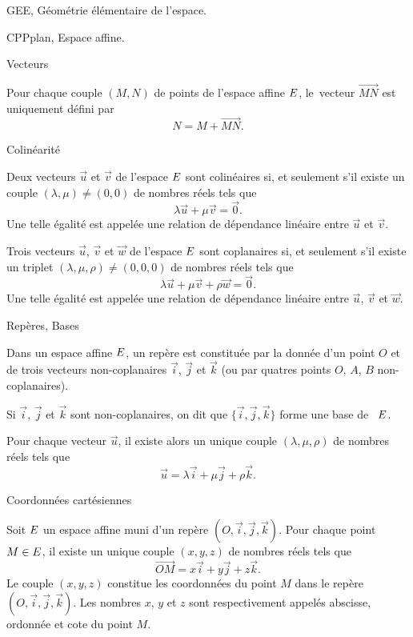 


\Chapter GEE, Géométrie élémentaire de l'espace.

\Section CPPplan, Espace affine. 

\Concept [] Vecteurs
 
\noindent
Pour chaque couple $(M,N)$ de points de l'espace affine $\sc E$, le~vecteur $\vec{MN}$ est uniquement défini par 
$$
N=M+\vec{MN}.
$$

\Concept [] Colinéarité 

\noindent
Deux vecteurs $\vec u$ et $\vec v$ de l'espace $\sc E$ sont colinéaires si, et seulement s'il existe un couple $(\lambda,\mu)\neq(0,0)$ de nombres réels tels que 
$$
\lambda \vec u+\mu\vec v=\vec 0.
$$
Une telle égalité est appelée une relation de dépendance linéaire entre $\vec u$ et $\vec v$. 
\bigskip

\noindent
Trois vecteurs $\vec u$, $\vec v$ et $\vec w$ de l'espace $\sc E$ sont coplanaires si, et seulement s'il existe un triplet $(\lambda,\mu, \rho)\neq(0,0,0)$ de nombres réels tels que 
$$
\lambda \vec u+\mu\vec v+\rho\vec w=\vec 0.
$$
Une telle égalité est appelée une relation de dépendance linéaire entre $\vec u$, $\vec v$ et $\vec w$. 
\bigskip


\Concept [] Repères, Bases

\noindent
Dans un espace affine $\sc E$, un repère est constituée par la donnée d'un point $O$ et de trois vecteurs non-coplanaires $\vec i$, $\vec j$ et $\vec k$ (ou par quatres points $O$, $A$, $B$ non-coplanaires). 
\medskip

\noindent
Si $\vec i$, $\vec j$ et $\vec k$ sont non-coplanaires, on dit que $\{\vec i,\vec j,\vec k\}$ forme une base de ~$\sc E$. 

\noindent
Pour chaque vecteur $\vec u$, il existe alors un unique couple $(\lambda,\mu,\rho)$ de nombres réels tels que 
$$
\vec u=\lambda \vec i+\mu\vec j+\rho\vec k.
$$ 

\Concept [] Coordonnées cartésiennes

\noindent
Soit $\sc E$ un espace affine muni d'un repère $(O,\vec i,\vec j,\vec k)$. Pour chaque point $M\in\sc E$, il existe un unique couple $(x,y,z)$ de nombres réels tels que 
$$
\vec{OM}=x\vec i+y\vec j+z\vec k.
$$
Le couple $(x,y,z)$ constitue les coordonnées du point $M$ dans le repère $(O,\vec i,\vec j,\vec k)$. Les nombres $x$, $y$ et $z$ sont respectivement appelés abscisse, ordonnée et cote du point $M$. 
 
